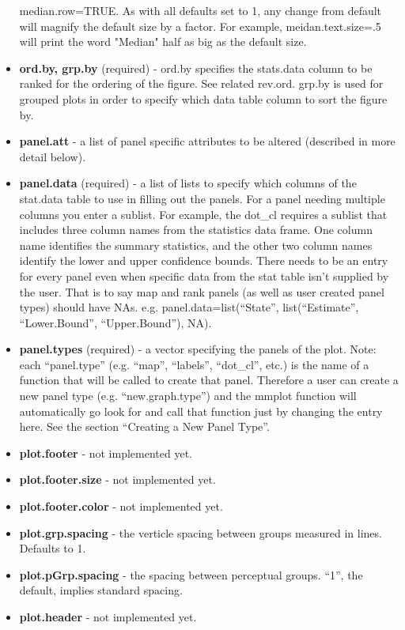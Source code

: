 \documentclass{article}
\begin{document}
\begin{itemize}
median.row=TRUE. As with all defaults set to 1, any change from default will magnify the default size by a factor.  For example, meidan.text.size=.5 will print the word "Median" half as big as the default size.
\item  \textbf{ord.by, grp.by} (required) - ord.by specifies the stats.data column to be ranked for the ordering of the figure. See related rev.ord.  grp.by is used for grouped plots in order to specify which data table column to sort the figure by.
\item  \textbf{panel.att} - a list of panel specific attributes to be altered (described in more detail below).
\item  \textbf{panel.data} (required) - a list of lists to specify which columns of the stat.data table to use in filling out the panels. For a panel needing multiple columns you enter a sublist. For example, the dot\_cl requires a sublist that includes three column names from the statistics data frame.  One column name identifies the summary statistics, and the other two column names identify the lower and upper confidence bounds.  There needs to be an entry for every panel even when specific data from the stat table isn't supplied by the user. That is to say map and rank panels (as well as user created panel types) should have NAs.
e.g. panel.data=list(``State'', list(``Estimate'', ``Lower.Bound'', ``Upper.Bound''), NA).
\item  \textbf{panel.types} (required) - a vector specifying the panels of the plot. Note: each ``panel.type'' (e.g. ``map'', ``labels'',
``dot\_cl'', etc.) is the name of a function that will be called to create that panel. Therefore a user can create a new panel type (e.g. ``new.graph.type'') and the mmplot function will automatically go look for and call that function just
by changing the entry here. See the section ``Creating a New Panel Type''.
\item  \textbf{plot.footer} - not implemented yet.
\item  \textbf{plot.footer.size} - not implemented yet.
\item  \textbf{plot.footer.color} - not implemented yet.
\item  \textbf{plot.grp.spacing} - the verticle spacing between groups measured in lines. Defaults to 1.
\item  \textbf{plot.pGrp.spacing} - the spacing between perceptual groups. ``1'', the default, implies standard spacing.
\item  \textbf{plot.header} - not implemented yet.

\end{itemize}
\end{document}
